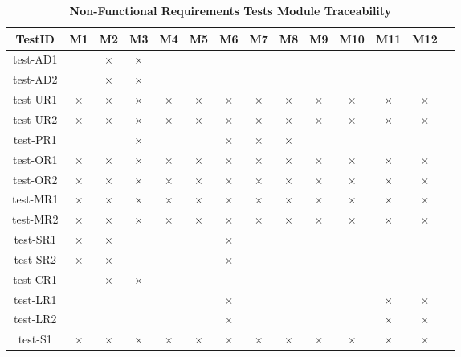 \documentclass[12pt, titlepage]{article}
\begin{document}
\begin{landscape}
\begin{table} [H]
  \centering
  \begin{tabular}{|c|c|c|c|c|c|c|c|c|c|c|c|c|c|}
    \hline
    TestID & M1 & M2 & M3 & M4 & M5 & M6 & M7 & M8 & M9 & M10 & M11 & M12 \\
    \hline
    test-AD1 & & $\times$ & $\times$ & & & & & & & & &\\
    \hline
    test-AD2 & & $\times$ & $\times$ & & & & & & & & &\\
    \hline
    test-UR1 & $\times$ & $\times$ & $\times$ & $\times$ & $\times$ & $\times$ & $\times$ & $\times$ & $\times$ & $\times$ & $\times$ & $\times$ \\
    \hline
    test-UR2 & $\times$ & $\times$ & $\times$ & $\times$ & $\times$ & $\times$ & $\times$ & $\times$ & $\times$ & $\times$ & $\times$ & $\times$ \\
    \hline
    test-PR1 & & & $\times$ & & & $\times$ & $\times$ & $\times$ & & & &\\
    \hline
    test-OR1 & $\times$ & $\times$ & $\times$ & $\times$ & $\times$ & $\times$ & $\times$ & $\times$ & $\times$ & $\times$ & $\times$ & $\times$ \\
    \hline
    test-OR2 & $\times$ & $\times$ & $\times$ & $\times$ & $\times$ & $\times$ & $\times$ & $\times$ & $\times$ & $\times$ & $\times$ & $\times$ \\
    \hline
    test-MR1 & $\times$ & $\times$ & $\times$ & $\times$ & $\times$ & $\times$ & $\times$ & $\times$ & $\times$ & $\times$ & $\times$ & $\times$ \\
    \hline
    test-MR2 & $\times$ & $\times$ & $\times$ & $\times$ & $\times$ & $\times$ & $\times$ & $\times$ & $\times$ & $\times$ & $\times$ & $\times$ \\
    \hline
    test-SR1 & $\times$ & $\times$ & & & & $\times$ & & & & & & \\
    \hline
    test-SR2 & $\times$ & $\times$ & & & & $\times$ & & & & & & \\
    \hline
    test-CR1 & & $\times$ & $\times$ & & & & & & & & & \\
    \hline
    test-LR1 & & & & & & $\times$ & & & & & $\times$ & $\times$\\
    \hline
    test-LR2 & & & & & & $\times$ & & & & & $\times$ & $\times$\\
    \hline
    test-S1 & $\times$ & $\times$ & $\times$ & $\times$ & $\times$ & $\times$ & $\times$ & $\times$ & $\times$ & $\times$ & $\times$ & $\times$ \\
    \hline
  \end{tabular}
\caption{\bf Non-Functional Requirements Tests Module Traceability} \label{tab:nfr-test-traceability}
\end{table}


\end{landscape}
\end{document}
